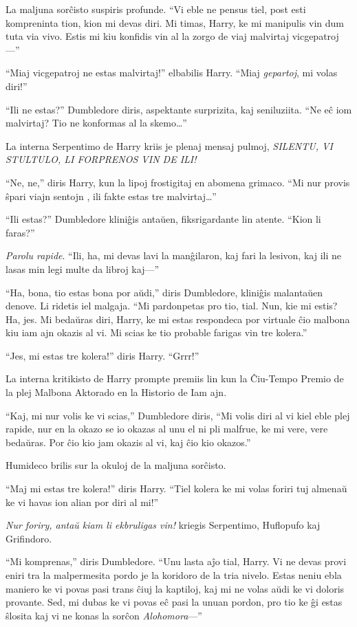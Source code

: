 La maljuna sorĉisto suspiris profunde. ``Vi eble ne pensus tiel, post
esti kompreninta tion, kion mi devas diri. Mi timas, Harry, ke mi
manipulis vin dum tuta via vivo. Estis mi kiu konfidis vin al la zorgo
de viaj malvirtaj vicgepatroj—''

``Miaj vicgepatroj ne estas malvirtaj!'' elbabilis Harry. ``Miaj \emph{gepartoj}, mi volas diri!''

``Ili ne estas?'' Dumbledore diris, aspektante surprizita, kaj
seniluziita. ``Ne eĉ iom malvirtaj? Tio ne konformas al la
skemo\ldots''

La interna Serpentimo de Harry kriis je plenaj mensaj pulmoj,
\emph{SILENTU, VI STULTULO, LI FORPRENOS VIN DE ILI!}

``Ne, ne,'' diris Harry, kun la lipoj frostigitaj en abomena
grimaco. ``Mi nur provis ŝpari viajn sentojn , ili fakte estas tre
malvirtaj\ldots''

``Ili estas?'' Dumbledore kliniĝis antaŭen, fiksrigardante lin
atente. ``Kion li faras?'' 

\emph{Parolu rapide}. ``Ili, ha, mi devas lavi la manĝilaron, kaj fari
la lesivon, kaj ili ne lasas min legi multe da libroj kaj—''

``Ha, bona, tio estas bona por aŭdi,'' diris Dumbledore, kliniĝis
malantaŭen denove. Li ridetis iel malgaja. ``Mi pardonpetas pro tio,
tial. Nun, kie mi estis? Ha, jes. Mi bedaŭras diri, Harry, ke mi estas
respondeca por virtuale ĉio malbona kiu iam ajn okazis al vi. Mi scias
ke tio probable farigas vin tre kolera.''


``Jes, mi estas tre kolera!'' diris Harry. ``Grrr!''

La interna kritikisto de Harry prompte premiis lin kun la Ĉiu-Tempo
Premio de la plej Malbona Aktorado en la Historio de Iam ajn.

``Kaj, mi nur volis ke vi scias,'' Dumbledore diris, ``Mi volis diri
al vi kiel eble plej rapide, nur en la okazo se io okazas al unu el ni
pli malfrue, ke mi vere, vere bedaŭras. Por ĉio kio jam okazis al vi,
kaj ĉio kio okazos.''

Humideco brilis sur la okuloj de la maljuna sorĉisto.

``Maj mi estas tre kolera!'' diris Harry. ``Tiel kolera ke mi volas
foriri tuj almenaŭ ke vi havas ion alian por diri al mi!''

\emph{Nur foriry, antaŭ kiam li ekbruligas vin!} kriegis Serpentimo, Huflopufo kaj Grifindoro.

``Mi komprenas,'' diris Dumbledore. ``Unu lasta aĵo tial, Harry. Vi ne
devas provi eniri tra la malpermesita pordo je la koridoro de la tria
nivelo. Estas neniu ebla maniero ke vi povas pasi trans ĉiuj la
kaptiloj, kaj mi ne volas aŭdi ke vi doloris provante. Sed, mi dubas
ke vi povas eĉ pasi la unuan pordon, pro tio ke ĝi estas ŝlosita kaj vi
ne konas la sorĉon \emph{Alohomora}—''

